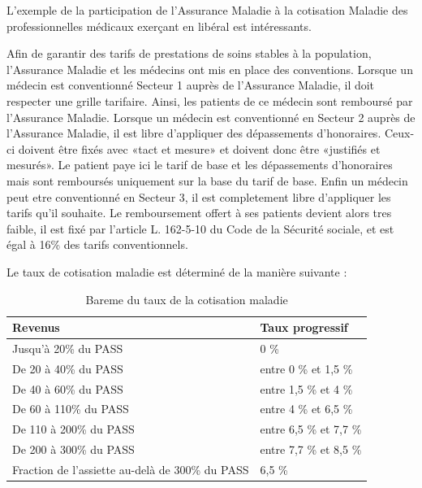 L'exemple de la participation de l'Assurance Maladie à la cotisation Maladie des professionnelles médicaux exerçant en libéral est intéressants.

Afin de garantir des tarifs de prestations de soins stables à la population, l'Assurance Maladie et les médecins ont mis en place des conventions.
Lorsque un médecin est conventionné Secteur 1 auprès de l'Assurance Maladie, il doit respecter une grille tarifaire. Ainsi, les patients de ce médecin sont remboursé par l'Assurance Maladie.
Lorsque un médecin est conventionné en Secteur 2 auprès de l'Assurance Maladie, il est libre d'appliquer des dépassements d'honoraires. Ceux-ci doivent être fixés avec «tact et mesure» et doivent donc être «justifiés et mesurés». Le patient paye ici le tarif de base et les dépassements d'honoraires mais sont remboursés uniquement sur la base du tarif de base.
Enfin un médecin peut etre conventionné en Secteur 3, il est completement libre d'appliquer les tarifs qu'il souhaite. Le remboursement offert à ses patients devient alors tres faible, il est fixé par l’article L. 162-5-10 du Code de la Sécurité sociale, et est égal à 16\% des tarifs conventionnels. 


Le taux de cotisation maladie est déterminé de la manière suivante :

\begin{table}[!ht]
    \raggedleft
    \caption{Bareme du taux de la cotisation maladie}
    \begin{tabular}{|p{8.5cm}|p{6cm}|}
    \hline \hline
        \textbf{Revenus} & \textbf{Taux progressif} 
        \\ \hline
        Jusqu'à 20\% du PASS & 0 \% 
        \\ \hline
        De 20 à 40\% du PASS & entre 0 \% et 1,5 \% 
        \\ \hline
        De 40 à 60\% du PASS & entre 1,5 \% et 4 \% 
        \\ \hline
        De 60 à 110\% du PASS & entre 4 \% et 6,5 \% 
        \\ \hline
        De 110 à 200\% du PASS & entre 6,5 \% et 7,7 \% 
        \\ \hline
        De 200 à 300\% du PASS & entre 7,7 \% et 8,5 \% 
        \\ \hline
        Fraction de l’assiette au-delà de 300\% du PASS & 6,5 \% 
        \\ \hline \hline
    \end{tabular}
\end{table}
 
